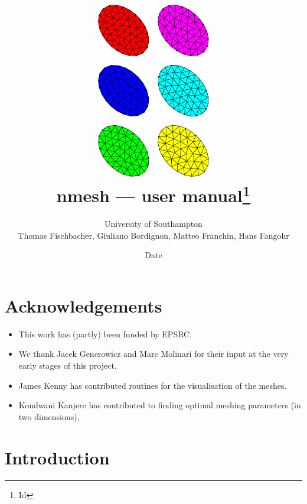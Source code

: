 \documentclass[10pt,a4paper]{book}
\begin{document}
 



\title{\includegraphics[width=5cm]{plots/somemesh}\\[2cm] 
\sffamily \huge nmesh --- user manual\thanks{ \sffamily \footnotesize $ $Id$ $}
}
\author{ \sffamily University of Southampton\\
\sffamily Thomas Fischbacher, Giuliano Bordignon, Matteo Franchin, Hans Fangohr\\}

\date{\small \sffamily $ $Date$ $ }

\maketitle


\chapter*{Acknowledgements}

\begin{itemize}
\item This work has (partly) been funded by EPSRC.
\item We thank Jacek Generowicz and Marc Molinari for their input at the
very early stages of this project. 
\item James Kenny has contributed routines for the visualisation of the meshes. 
\item Kondwani Kanjere has
contributed to finding optimal meshing parameters (in two dimensions),
\end{itemize}

\tableofcontents
\chapter{Introduction}
\end{document}
